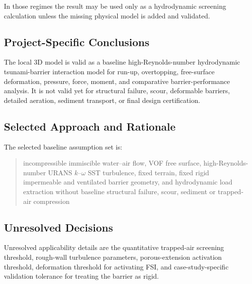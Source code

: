 In those regimes the result may be used only as a hydrodynamic
screening calculation unless the missing physical model is added and
validated.

\subsection{Project-Specific Conclusions}
\label{sec:res-mod-asm-conclusions}


The local 3D model is valid as a baseline high-Reynolds-number
hydrodynamic tsunami-barrier interaction model for run-up, overtopping,
free-surface deformation, pressure, force, moment, and comparative
barrier-performance analysis. It is not valid yet for structural
failure, scour, deformable barriers, detailed aeration, sediment
transport, or final design certification.

\subsection{Selected Approach and Rationale}
\label{sec:res-mod-asm-selected-approach}


The selected baseline assumption set is:

\begin{quote}
  incompressible immiscible water--air flow, VOF free surface,
  high-Reynolds-number URANS $k$--$\omega$ SST turbulence, fixed
  terrain, fixed rigid impermeable and ventilated barrier geometry, and
  hydrodynamic load extraction without baseline structural failure,
  scour, sediment or trapped-air compression
\end{quote}

\subsection{Unresolved Decisions}
\label{sec:res-mod-asm-unresolved-decisions}


Unresolved applicability details are the quantitative trapped-air
screening threshold, rough-wall turbulence parameters, porous-extension
activation threshold, deformation threshold for activating FSI, and
case-study-specific validation tolerance for treating the barrier as
rigid.

